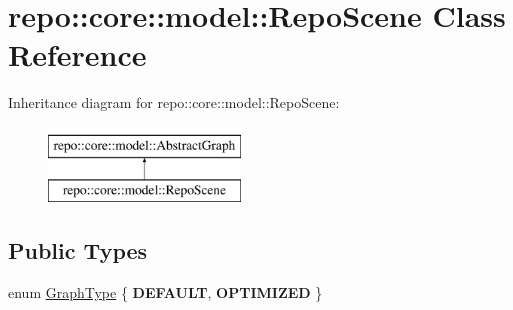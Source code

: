 \hypertarget{classrepo_1_1core_1_1model_1_1_repo_scene}{}\section{repo\+:\+:core\+:\+:model\+:\+:Repo\+Scene Class Reference}
\label{classrepo_1_1core_1_1model_1_1_repo_scene}
Inheritance diagram for repo\+:\+:core\+:\+:model\+:\+:Repo\+Scene\+:\begin{figure}[H]
\begin{center}
\leavevmode
\includegraphics[height=2.000000cm]{classrepo_1_1core_1_1model_1_1_repo_scene}
\end{center}
\end{figure}
\subsection*{Public Types}
\begin{DoxyCompactItemize}
\item 
enum \hyperlink{classrepo_1_1core_1_1model_1_1_repo_scene_aefcacd6eb4c7774ac1bfe3a6b223337c}{Graph\+Type} \{ {\bfseries D\+E\+F\+A\+U\+L\+T}, 
{\bfseries O\+P\+T\+I\+M\+I\+Z\+E\+D}
 \}
\end{DoxyCompactItemize}

